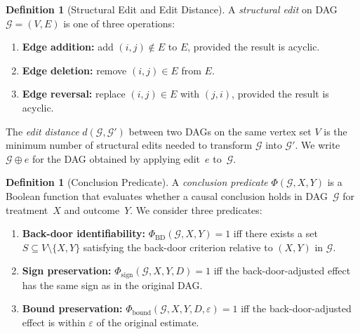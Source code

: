 \documentclass[11pt,a4paper]{article}
\theoremstyle{definition}
\newtheorem{definition}[theorem]{Definition}
\theoremstyle{remark}
\newcommand{\DAG}{\mathcal{G}}
\newcommand{\editdist}{d}
\newcommand{\Phi}{\varPhi}
\begin{document}
\begin{definition}[Structural Edit and Edit Distance]\label{def:edit}
A \emph{structural edit} on DAG $\DAG = (V, E)$ is one of three operations:
\begin{enumerate}[label=(\alph*)]
  \item \textbf{Edge addition:} add $(i, j) \notin E$ to $E$, provided the result is
    acyclic.
  \item \textbf{Edge deletion:} remove $(i, j) \in E$ from $E$.
  \item \textbf{Edge reversal:} replace $(i, j) \in E$ with $(j, i)$, provided the
    result is acyclic.
\end{enumerate}
The \emph{edit distance} $\editdist(\DAG, \DAG')$ between two DAGs on the same vertex
set $V$ is the minimum number of structural edits needed to transform $\DAG$ into
$\DAG'$. We write $\DAG \oplus e$ for the DAG obtained by applying edit~$e$ to~$\DAG$.
\end{definition}

\begin{definition}[Conclusion Predicate]\label{def:predicate}
A \emph{conclusion predicate} $\Phi(\DAG, X, Y)$ is a Boolean function that evaluates
whether a causal conclusion holds in DAG~$\DAG$ for treatment~$X$ and outcome~$Y$. We
consider three predicates:
\begin{enumerate}[label=(\roman*)]
  \item \textbf{Back-door identifiability:} $\Phi_{\mathrm{BD}}(\DAG, X, Y) = 1$ iff
    there exists a set $S \subseteq V \setminus \{X, Y\}$ satisfying the back-door
    criterion relative to $(X, Y)$ in $\DAG$.
  \item \textbf{Sign preservation:} $\Phi_{\mathrm{sign}}(\DAG, X, Y, D) = 1$ iff
    the back-door-adjusted effect has the same sign as in the original DAG.
  \item \textbf{Bound preservation:} $\Phi_{\mathrm{bound}}(\DAG, X, Y, D, \varepsilon) = 1$
    iff the back-door-adjusted effect is within $\varepsilon$ of the original estimate.
\end{enumerate}
\end{definition}
\end{document}
